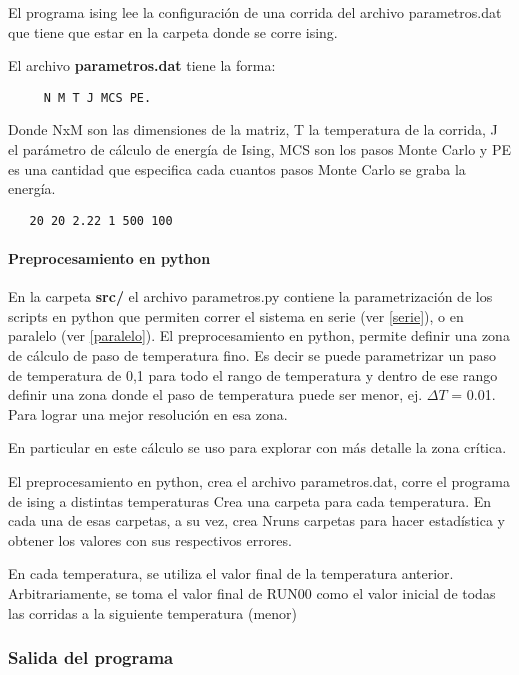 El programa ising lee la configuraci\'on de una corrida del 
archivo parametros.dat que tiene que estar en la carpeta donde se
corre ising.

El archivo \textbf{parametros.dat} tiene la forma: 

\begin{verbatim}
     N M T J MCS PE. 
\end{verbatim}

Donde NxM 
son las dimensiones de la matriz, T la temperatura de la corrida,
J el par\'ametro de c\'alculo de energ\'ia de Ising, MCS son los pasos Monte Carlo y PE
es una cantidad que especifica cada cuantos pasos Monte Carlo se graba la energ\'ia.

\begin{verbatim}
   20 20 2.22 1 500 100
\end{verbatim}


\paragraph{Preprocesamiento en python}
En la carpeta \textbf{src/} el archivo parametros.py contiene la parametrizaci\'on 
de los scripts
en python que permiten correr el sistema en serie (ver \ref{serie}), 
o en paralelo (ver \ref{paralelo}).
El preprocesamiento en python, permite definir una zona de c\'alculo de paso
de temperatura fino. Es decir se puede parametrizar un paso de temperatura de
0,1 para todo el rango de temperatura y dentro de ese rango definir una zona
donde el paso de temperatura puede ser menor, ej. $\Delta T$ = 0.01. Para lograr una mejor resoluci\'on
en esa zona.

En particular en este c\'alculo se uso para explorar con m\'as detalle la zona
cr\'itica.

El preprocesamiento en python, crea el archivo parametros.dat, 
 corre el programa de ising a distintas temperaturas
  Crea una carpeta para cada temperatura. En cada una de esas carpetas, a su
  vez, crea Nruns carpetas para hacer estadística y obtener los valores con
  sus respectivos errores.
 
  En cada temperatura, se utiliza el valor final de la temperatura anterior.
  Arbitrariamente, se toma el valor final de RUN00 como el valor inicial de
  todas las corridas a la siguiente temperatura (menor)
 

\subsubsection{Salida del programa}

